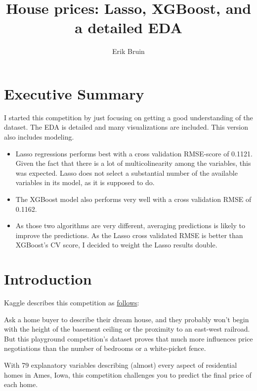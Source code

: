 \documentclass[]{article}
\title{House prices: Lasso, XGBoost, and a detailed EDA}
\author{Erik Bruin}
\date{}
\providecommand{\tightlist}{%
  \setlength{\itemsep}{0pt}\setlength{\parskip}{0pt}}
\begin{document}
\maketitle

{
\setcounter{tocdepth}{3}
\tableofcontents
}
\section{Executive Summary}\label{executive-summary}

I started this competition by just focusing on getting a good
understanding of the dataset. The EDA is detailed and many
visualizations are included. This version also includes modeling.

\begin{itemize}
\tightlist
\item
  Lasso regressions performs best with a cross validation RMSE-score of
  0.1121. Given the fact that there is a lot of multicolinearity among
  the variables, this was expected. Lasso does not select a substantial
  number of the available variables in its model, as it is supposed to
  do.
\item
  The XGBoost model also performs very well with a cross validation RMSE
  of 0.1162.
\item
  As those two algorithms are very different, averaging predictions is
  likely to improve the predictions. As the Lasso cross validated RMSE
  is better than XGBoost's CV score, I decided to weight the Lasso
  results double.
\end{itemize}

\section{Introduction}\label{introduction}

Kaggle describes this competition as
\href{https://www.kaggle.com/c/house-prices-advanced-regression-techniques}{follows}:

Ask a home buyer to describe their dream house, and they probably won't
begin with the height of the basement ceiling or the proximity to an
east-west railroad. But this playground competition's dataset proves
that much more influences price negotiations than the number of bedrooms
or a white-picket fence.

With 79 explanatory variables describing (almost) every aspect of
residential homes in Ames, Iowa, this competition challenges you to
predict the final price of each home.
\end{document}
